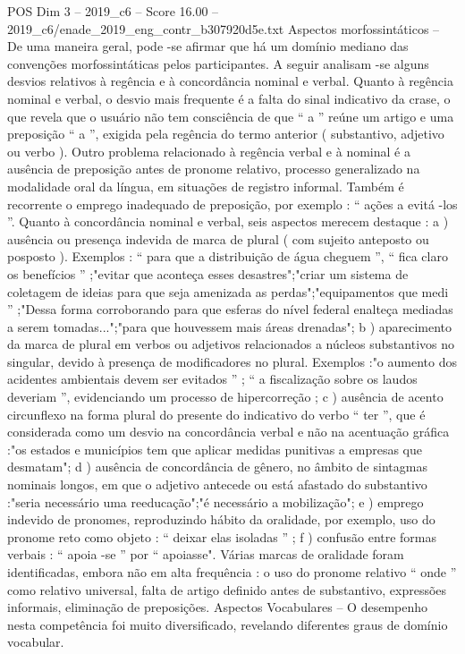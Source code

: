 \begin{textsample}{POS Dim 3 – 2019\_c6 – Score 16.00 – 2019\_c6/enade\_2019\_eng\_contr\_b307920d5e.txt}
Aspectos morfossintáticos – De uma maneira geral, pode -se afirmar que há um domínio mediano das convenções morfossintáticas pelos participantes.
A seguir analisam -se alguns desvios relativos à regência e à concordância nominal e verbal.
Quanto à regência nominal e verbal, o desvio mais frequente é a falta do sinal indicativo da crase, o que revela que o usuário não tem consciência de que “ a ” reúne um artigo e uma preposição “ a ”, exigida pela regência do termo anterior ( substantivo, adjetivo ou verbo ).
Outro problema relacionado à regência verbal e à nominal é a ausência de preposição antes de pronome relativo, processo generalizado na modalidade oral da língua, em situações de registro informal.
Também é recorrente o emprego inadequado de preposição, por exemplo : “ ações a evitá -los ”.
Quanto à concordância nominal e verbal, seis aspectos merecem destaque : a ) ausência ou presença indevida de marca de plural ( com sujeito anteposto ou posposto ).
Exemplos : “ para que a distribuição de água cheguem ”, “ fica claro os benefícios ” ;"evitar que aconteça esses desastres";"criar um sistema de coletagem de ideias para que seja amenizada as perdas";"equipamentos que medi ” ;"Dessa forma corroborando para que esferas do nível federal enalteça mediadas a serem tomadas...";"para que houvessem mais áreas drenadas"; b ) aparecimento da marca de plural em verbos ou adjetivos relacionados a núcleos substantivos no singular, devido à presença de modificadores no plural.
Exemplos :"o aumento dos acidentes ambientais devem ser evitados ” ; “ a fiscalização sobre os laudos deveriam ”, evidenciando um processo de hipercorreção ; c ) ausência de acento circunflexo na forma plural do presente do indicativo do verbo “ ter ”, que é considerada como um desvio na concordância verbal e não na acentuação gráfica :"os estados e municípios tem que aplicar medidas punitivas a empresas que desmatam"; d ) ausência de concordância de gênero, no âmbito de sintagmas nominais longos, em que o adjetivo antecede ou está afastado do substantivo :"seria necessário uma reeducação";"é necessário a mobilização"; e ) emprego indevido de pronomes, reproduzindo hábito da oralidade, por exemplo, uso do pronome reto como objeto : “ deixar elas isoladas ” ; f ) confusão entre formas verbais : “ apoia -se ” por “ apoiasse".
Várias marcas de oralidade foram identificadas, embora não em alta frequência : o uso do pronome relativo “ onde ” como relativo universal, falta de artigo definido antes de substantivo, expressões informais, eliminação de preposições.
Aspectos Vocabulares – O desempenho nesta competência foi muito diversificado, revelando diferentes graus de domínio vocabular.

\end{textsample}
